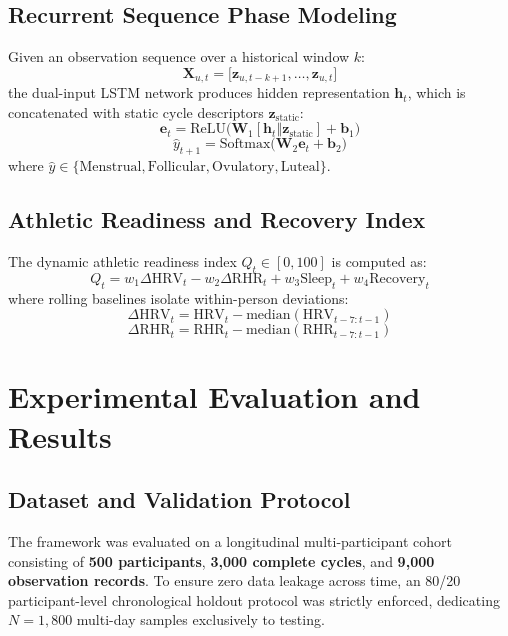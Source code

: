 \documentclass[conference]{IEEEtran}
\begin{document}
\subsection{Recurrent Sequence Phase Modeling}
Given an observation sequence over a historical window $k$:
\begin{equation}
\mathbf{X}_{u,t} = \big[ \mathbf{z}_{u,t-k+1}, \dots, \mathbf{z}_{u,t} \big]
\end{equation}
the dual-input LSTM network produces hidden representation $\mathbf{h}_t$, which is concatenated with static cycle descriptors $\mathbf{z}_{\text{static}}$:
\begin{equation}
\mathbf{e}_t = \text{ReLU}\big( \mathbf{W}_1 [\mathbf{h}_t \mathbin{\Vert} \mathbf{z}_{\text{static}}] + \mathbf{b}_1 \big)
\end{equation}
\begin{equation}
\hat{y}_{t+1} = \text{Softmax}\big( \mathbf{W}_2 \mathbf{e}_t + \mathbf{b}_2 \big)
\end{equation}
where $\hat{y} \in \{\text{Menstrual}, \text{Follicular}, \text{Ovulatory}, \text{Luteal}\}$.

\subsection{Athletic Readiness and Recovery Index}
The dynamic athletic readiness index $Q_t \in [0, 100]$ is computed as:
\begin{equation}
Q_t = w_1 \Delta\text{HRV}_t - w_2 \Delta\text{RHR}_t + w_3 \text{Sleep}_t + w_4 \text{Recovery}_t
\end{equation}
where rolling baselines isolate within-person deviations:
\begin{equation}
\Delta\text{HRV}_t = \text{HRV}_t - \text{median}(\text{HRV}_{t-7:t-1})
\end{equation}
\begin{equation}
\Delta\text{RHR}_t = \text{RHR}_t - \text{median}(\text{RHR}_{t-7:t-1})
\end{equation}

\section{Experimental Evaluation and Results}

\subsection{Dataset and Validation Protocol}
The framework was evaluated on a longitudinal multi-participant cohort consisting of \textbf{500 participants}, \textbf{3,000 complete cycles}, and \textbf{9,000 observation records}. To ensure zero data leakage across time, an 80/20 participant-level chronological holdout protocol was strictly enforced, dedicating $N = 1{,}800$ multi-day samples exclusively to testing.
\end{document}
